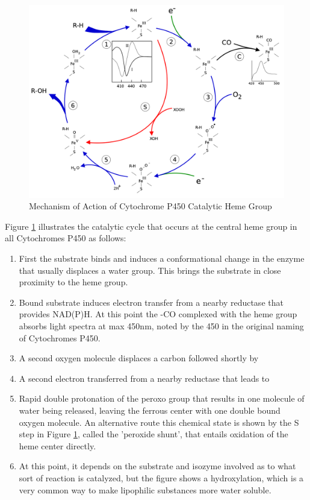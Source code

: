 \begin{figure}[H]
  \centering
   \includegraphics[width=1\textwidth]{../img/P450MOA.png}
  \caption{Mechanism of Action of Cytochrome P450 Catalytic Heme Group}
  \label{fig:P450MOA}
\end{figure}

Figure \ref{fig:P450MOA} illustrates the catalytic cycle that occurs at the central heme group in all Cytochromes P450 as follows:
\begin{enumerate}
\item First the substrate binds and induces a conformational change in the enzyme that usually displaces a water group. This brings the substrate in close proximity to the heme group.
\item Bound substrate induces electron transfer from a nearby reductase that provides NAD(P)H. At this point the -CO complexed with the heme group absorbs light spectra at max 450nm, noted by the 450 in the original naming of Cytochromes P450.
\item A second oxygen molecule displaces a carbon followed shortly by
\item A second electron transferred from a nearby reductase that leads to
\item Rapid double protonation of the peroxo group that results in one molecule of water being released, leaving the ferrous center with one double bound oxygen molecule. An alternative route this chemical state is shown by the S step in Figure \ref{fig:P450MOA}, called the 'peroxide shunt', that entails oxidation of the heme center directly.
\item At this point, it depends on the substrate and isozyme involved as to what sort of reaction is catalyzed, but the figure shows a hydroxylation, which is a very common way to make lipophilic substances more water soluble.
\end{enumerate}


